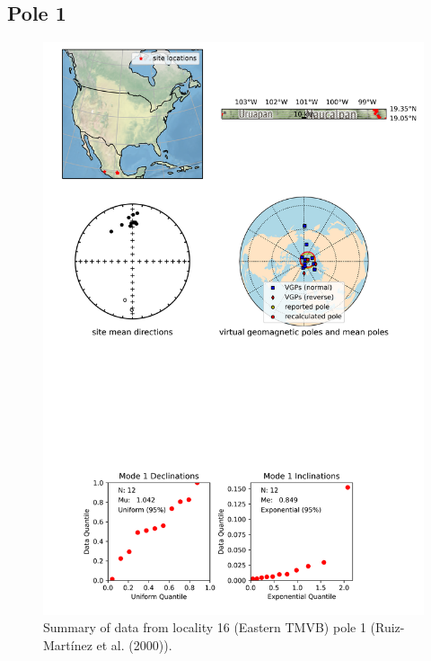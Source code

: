 \subsection{Pole 1}


\begin{figure}[H]
\centering
\includegraphics[width=5 in]{./16/1/pole_summary.png}
\caption{Summary of data from locality 16 (Eastern TMVB) pole 1 (Ruiz-Martínez et al. (2000)).}
\end{figure}

